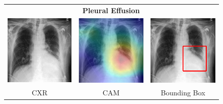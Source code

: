 \begin{figure}[htbp!]
\centering
\begin{tabular}{ccc}
 &\textbf{Pleural Effusion}& \\
\vspace{2mm}
  \includegraphics[width=35mm]{Tesi/images/CAMs/CAM12/image.png} &   
  \includegraphics[width=35mm]{Tesi/images/CAMs/CAM12/image_cam.png} &   
  \includegraphics[width=35mm]{Tesi/images/CAMs/CAM12/image_bbox.png} \\
\footnotesize{CXR} & \footnotesize{CAM} & \footnotesize{Bounding Box} \\[6pt]
\end{tabular}
\caption[Pleural Effusion CAM-1]{}
\label{fig:figure_5.26}
\end{figure}

